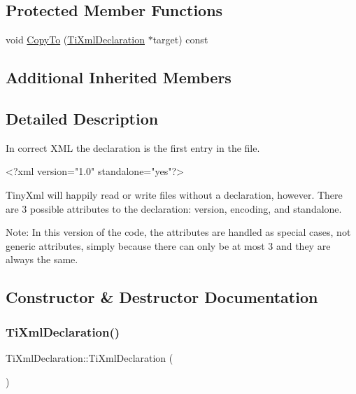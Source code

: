 \subsection*{Protected Member Functions}
\begin{DoxyCompactItemize}
\item 
void \hyperlink{class_ti_xml_declaration_a189de17b3e04d4e5b1c385336f214af1}{Copy\+To} (\hyperlink{class_ti_xml_declaration}{Ti\+Xml\+Declaration} $\ast$target) const
\end{DoxyCompactItemize}
\subsection*{Additional Inherited Members}


\subsection{Detailed Description}
In correct X\+ML the declaration is the first entry in the file. \begin{DoxyVerb}    <?xml version="1.0" standalone="yes"?>
\end{DoxyVerb}


Tiny\+Xml will happily read or write files without a declaration, however. There are 3 possible attributes to the declaration\+: version, encoding, and standalone.

Note\+: In this version of the code, the attributes are handled as special cases, not generic attributes, simply because there can only be at most 3 and they are always the same. 

\subsection{Constructor \& Destructor Documentation}
\mbox{\label{class_ti_xml_declaration_aa0484d059bea0ea1acb47c9094382d79}} 
\subsubsection{\texorpdfstring{Ti\+Xml\+Declaration()}{TiXmlDeclaration()}\hspace{0.1cm}{\footnotesize\ttfamily [1/3]}}
{\footnotesize\ttfamily Ti\+Xml\+Declaration\+::\+Ti\+Xml\+Declaration (\begin{DoxyParamCaption}{ }\end{DoxyParamCaption})\hspace{0.3cm}{\ttfamily [inline]}}



